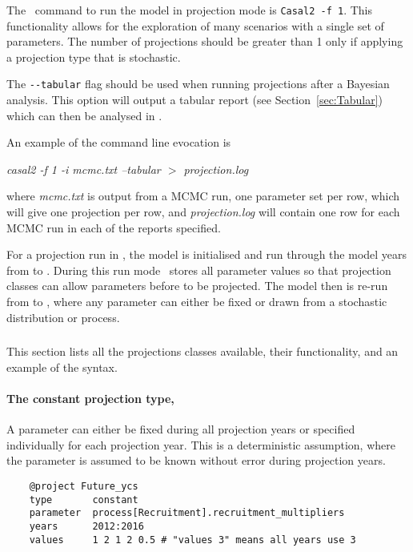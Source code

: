 The \CNAME\ command to run the model in projection mode is \texttt{Casal2 -f 1}. This functionality allows for the exploration of many scenarios with a single set of parameters. The number of projections should be greater than 1 only if applying a projection type that is stochastic.

The \texttt{-{}-tabular} flag should be used when running projections after a Bayesian analysis. This option will output a tabular report (see Section~\ref{sec:Tabular}) which can then be analysed in \R.

An example of the command line evocation is

\textit{casal2 -f 1 -i mcmc.txt --tabular $>$ projection.log}

where \textit{mcmc.txt} is output from a MCMC run, one parameter set per row, which will give one projection per row, and \textit{projection.log} will contain one row for each MCMC run in each of the reports specified.

For a projection run in \CNAME, the model is initialised and run through the model years from  to . During this run mode \CNAME\ stores all parameter values so that projection classes can allow parameters before  to be projected. The model then is re-run from  to , where any parameter can either be fixed or drawn from a stochastic distribution or process.


\subsubsection{\label{sec:ProjectionMethods}}

This section lists all the projections classes available, their functionality, and an example of the syntax.

\paragraph[Constant]{The constant projection type, }\label{sec:Project-Constant}

A parameter can either be fixed during all projection years or specified individually for each projection year. This is a deterministic assumption, where the parameter is assumed to be known without error during projection years.

{\small{\begin{verbatim}
	@project Future_ycs
	type       constant
	parameter  process[Recruitment].recruitment_multipliers
	years      2012:2016
	values     1 2 1 2 0.5 # "values 3" means all years use 3
\end{verbatim}}}

